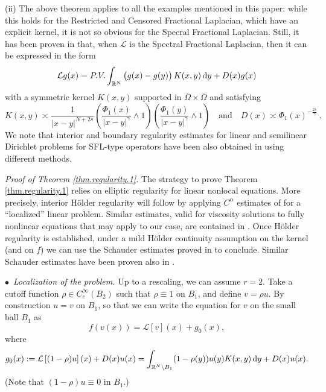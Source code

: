 \documentclass[11pt]{article}
\numberwithin{equation}{section}
\newcommand{\dy}{\,{\rm d}y}
\newcommand{\A}{\mathcal{L}}
\newcommand{\RR}{\mathbb{R}}
\begin{document}
\noindent(ii) The above theorem applies to all the examples mentioned in this paper: while this holds for the Restricted and Censored Fractional Laplacian, which have an explicit kernel, it is not so obvious for the Specral Fractional Laplacian. Still, it has been proven in \cite{SV2003} that, when $\A$ is the Spectral Fractional Laplacian, then it can be expressed in the form
\[
\A g(x)=P.V.\int_{\RR^N} \big(g(x)-g(y)\big)\,K(x,y)\dy + D(x)g(x)
\]
with a symmetric kernel $K(x,y)$ supported in $\overline{\Omega}\times\overline{\Omega}$ and satisfying
\[
K(x,y)\asymp\frac{1}{|x-y|^{N+2s}}
\left(\frac{\Phi_1(x)}{|x-y|^\gamma }\wedge 1\right)
\left(\frac{\Phi_1(y)}{|x-y|^\gamma }\wedge 1\right)\quad\mbox{and}\quad D(x)\asymp \Phi_1(x)^{-\frac{2s}{\gamma}}\,.
\]
 We note that interior and boundary regularity estimates for linear and semilinear Dirichlet problems for SFL-type operators have been also obtained in \cite{CS2016,CDDS} using different methods.


\medskip


\noindent\textit{Proof of Theorem \ref{thm.regularity.1}. }
The strategy to prove Theorem \ref{thm.regularity.1} relies on elliptic regularity for linear nonlocal equations. More precisely,  interior H\"older regularity will follow by applying $C^{\alpha}$ estimates of \cite{Ka}  for a ``localized'' linear problem. Similar estimates, valid for viscosity solutions to fully nonlinear equations that may apply to our case, are contained in \cite{BCI, CS2, CS3,  Si}. Once H\"older regularity is established, under a mild H\"older continuity assumption on the kernel (and on $f$) we can use the   Schauder estimates proved in  \cite{BaFiVa} to conclude. Similar Schauder estimates have been proven also in \cite{DK}.
\medskip

\noindent$\bullet$~\textit{Localization of the problem. }
Up to a rescaling, we can assume $r=2$. Take a cutoff function $\rho\in C^\infty_c(B_2)$ such that $\rho\equiv 1$ on $B_1$, and define $v=\rho u$. By construction $u=v$ on $B_1$, so that we can write the equation for $v$ on the small ball $B_1$ as
\begin{equation}\label{localization}
f(v(x)) = \A [v](x) +g_0(x),
\end{equation}
where
$$
g_0(x):= \A\left[(1-\rho)u\right](x)+D(x)u(x)=\int_{\RR^N\setminus B_1}(1-\rho(y))u(y)  K(x,y)\dy+D(x)u(x).
$$
(Note that $(1-\rho)u\equiv 0$ in $B_1$.)
\end{document}
